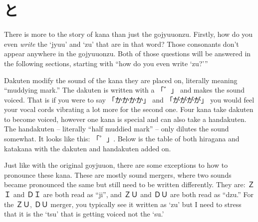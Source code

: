 \section[濁点と半濁点]{と}\label{sec:PR仮名濁点と半濁点}

There is more to the story of kana than just the gojyuuonzu. Firstly, how do you even \textit{write} the `jyuu' and `zu' that are in that word? Those consonants don't appear anywhere in the gojyuuonzu. Both of those questions will be answered in the following sections, starting with ``how do you even write `zu?'''

Dakuten modify the sound of the kana they are placed on, literally meaning ``muddying mark.'' The dakuten is written with a 「゛」 and makes the sound voiced. That is if you were to say 「かかかか」 and 「がががが」 you would feel your vocal cords vibrating a lot more for the second one. Four kana take dakuten to become voiced, however one kana is special and can also take a handakuten. The handakuten -- literally ``half muddied mark'' -- only dilutes the sound somewhat. It looks like this: 「゜」. Below is the table of both hiragana and katakana with the dakuten and handakuten added on.





Just like with the original goyjuuon, there are some exceptions to how to pronounce these kana. These are mostly sound mergers, where two sounds became pronounced the same but still need to be written differently. They are: ＺＩ and ＤＩ are both read as ``ji'', and ＺＵ and ＤＵ are both read as ``dzu.'' For the ＺＵ, ＤＵ merger, you typically see it written as `zu' but I need to stress that it is the `tsu' that is getting voiced not the `su.'

